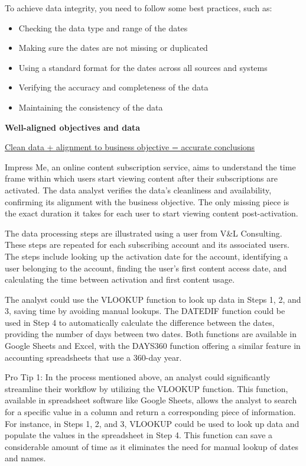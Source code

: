 \documentclass[]{article}
\begin{document}
To achieve data integrity, you need to follow some best practices, such as:

\begin{itemize}
  \item Checking the data type and range of the dates
  \item Making sure the dates are not missing or duplicated
  \item Using a standard format for the dates across all sources and systems
  \item Verifying the accuracy and completeness of the data
  \item Maintaining the consistency of the data
\end{itemize}

\textbf{Well-aligned objectives and data}\par
\uline{Clean data + alignment to business objective = accurate conclusions} \par

Impress Me, an online content subscription service, aims to understand the time frame within which users start viewing content after their subscriptions are activated. The data analyst verifies the data's cleanliness and availability, confirming its alignment with the business objective. The only missing piece is the exact duration it takes for each user to start viewing content post-activation.

The data processing steps are illustrated using a user from V\&L Consulting. These steps are repeated for each subscribing account and its associated users. The steps include looking up the activation date for the account, identifying a user belonging to the account, finding the user's first content access date, and calculating the time between activation and first content usage.

The analyst could use the VLOOKUP function to look up data in Steps 1, 2, and 3, saving time by avoiding manual lookups. The DATEDIF function could be used in Step 4 to automatically calculate the difference between the dates, providing the number of days between two dates. Both functions are available in Google Sheets and Excel, with the DAYS360 function offering a similar feature in accounting spreadsheets that use a 360-day year.

Pro Tip 1: In the process mentioned above, an analyst could significantly streamline their workflow by utilizing the VLOOKUP function. This function, available in spreadsheet software like Google Sheets, allows the analyst to search for a specific value in a column and return a corresponding piece of information. For instance, in Steps 1, 2, and 3, VLOOKUP could be used to look up data and populate the values in the spreadsheet in Step 4. This function can save a considerable amount of time as it eliminates the need for manual lookup of dates and names.
\end{document}
